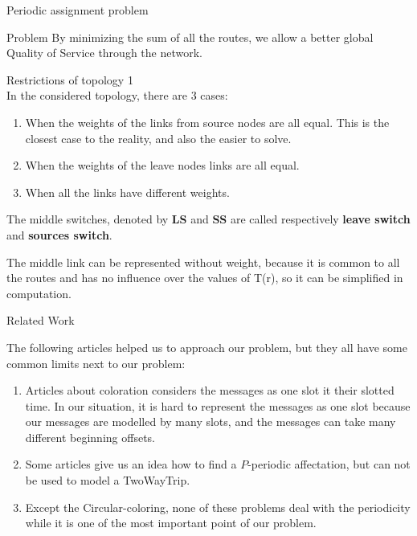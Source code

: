 \documentclass[a4paper,10pt]{report}
\begin{document}
\begin{chapter}{Periodic assignment problem}
\begin{section}{Problem}
By minimizing the sum of all the routes, we allow a better global Quality of Service through the network.\\
\begin{subsection}{Restrictions of topology 1}
\label{topologiescases}
\\


In the considered topology, there are 3 cases:
\begin{enumerate}
 \item When the weights of the links from source nodes are all equal. This is the closest case to the reality, and also the easier to solve.
 \item When the weights of the leave nodes links are all equal.
 \item When all the links have different weights.
\end{enumerate}

The middle switches, denoted by {\bf LS} and {\bf SS} are called respectively {\bf leave switch} and {\bf sources switch}.

The middle link can be represented without weight, because it is common to all the routes and has no influence over the values of T(r), so it can be simplified in computation. 

\end{subsection}
\end{section}
\begin{section}{Related Work}

The following articles helped us to approach our problem, but they all have some common limits next to our problem:
\begin{enumerate}
 \item Articles about coloration considers the messages as one slot it their slotted time. In our situation, it is hard to represent the messages as one slot because our messages are modelled by many slots, and the messages can take many different beginning offsets.
 \item Some articles give us an idea how to find a $P$-periodic affectation, but can not be used to model a TwoWayTrip. 
 \item Except the Circular-coloring, none of these problems deal with the periodicity while it is one of the most important point of our problem.
 

\end{enumerate}
\end{section}
\end{chapter}
\end{document}

